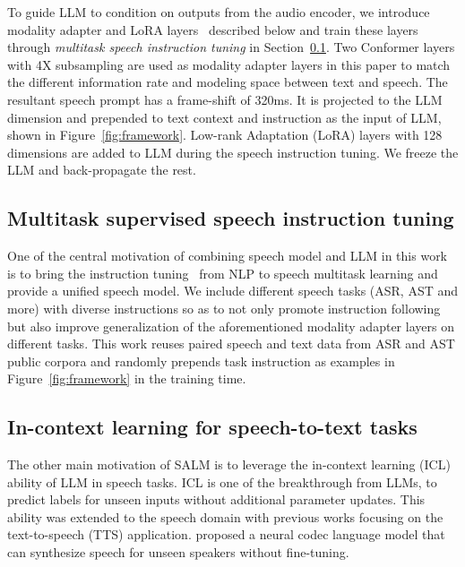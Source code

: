 \documentclass{article}
\begin{document}
To guide LLM to condition on outputs from the audio encoder, we introduce modality adapter and LoRA layers~\cite{hu2021lora} described below and train these layers through {\em multitask speech instruction tuning} in Section~\ref{sec:speech-sft}. Two Conformer layers with 4X subsampling are used as modality adapter layers in this paper to match the different information rate and modeling space between text and speech. 
The resultant speech prompt has a frame-shift of 320ms. It is projected to the LLM dimension and prepended to text context and instruction as the input of LLM, shown in Figure~\ref{fig:framework}.
Low-rank Adaptation (LoRA) layers with 128 dimensions are added to LLM during the speech instruction tuning. We freeze the LLM and back-propagate the rest.

\vspace{-0.8em}
\subsection{Multitask supervised speech instruction tuning} 
\label{sec:speech-sft}
\vspace{-0.4em}
One of the central motivation of combining speech model and LLM in this work is to bring the instruction tuning~\cite{flandataset} from NLP to speech multitask learning and provide a unified speech model. 
We include different speech tasks (ASR, AST and more) with diverse instructions so as to not only promote instruction following but also improve generalization of the aforementioned  modality adapter layers on different tasks.
%
This work reuses paired speech and text data from ASR and AST public corpora and randomly prepends task instruction as examples in Figure~\ref{fig:framework} in the training time. 

\vspace{-0.8em}
\subsection{In-context learning for speech-to-text tasks}
\label{sec:icl-wb}
\vspace{-0.4em}

The other main motivation of SALM is to leverage the in-context learning (ICL) ability of LLM in speech tasks. 
%
ICL is 
one of the breakthrough from LLMs, to predict labels for unseen inputs without additional parameter updates. This ability was extended to the speech domain with previous works focusing on the text-to-speech (TTS) application. \cite{wang2023neural} proposed a neural codec language model that can synthesize speech for unseen speakers without fine-tuning.
\end{document}
